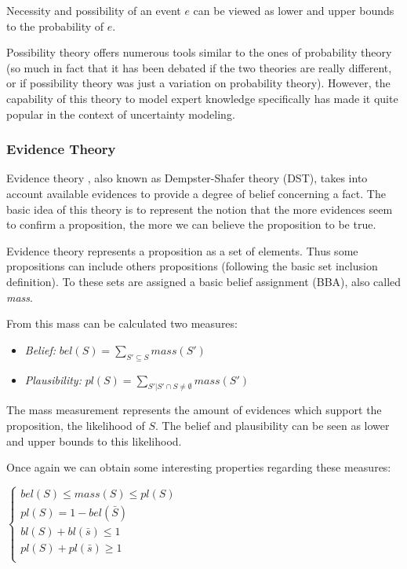 Necessity and possibility of an event $e$ can be viewed as lower and upper bounds to the probability of $e$.

Possibility theory offers numerous tools similar to the ones of probability theory (so much in fact that it has been debated if the two theories are really different, or if possibility theory was just a variation on probability theory). However, the capability of this theory to model expert knowledge specifically has made it quite popular in the context of uncertainty modeling.

\subsubsection{Evidence Theory}

Evidence theory \cite{shafer1976mathematical}, also known as Dempster-Shafer theory (DST), takes into account available evidences to provide a degree of belief concerning a fact.
The basic idea of this theory is to represent the notion that the more evidences seem to confirm a proposition, the more we can believe the proposition to be true.

Evidence theory represents a proposition as a set of elements. Thus some propositions can include others propositions (following the basic set inclusion definition). To these sets are assigned a basic belief assignment (BBA), also called \emph{mass}.

From this mass can be calculated two measures:

\begin{itemize}
\item \emph{Belief:} $bel(S) = \displaystyle\sum_{S'\subseteq{S}} mass(S')$
\item \emph{Plausibility:} $pl(S) = \displaystyle\sum_{S'|S' \cap S \neq \emptyset} mass(S')$
\end{itemize}

The mass measurement represents the amount of evidences which support the proposition, the likelihood of $S$. The belief and plausibility can be seen as lower and upper bounds to this likelihood.

Once again we can obtain some interesting properties regarding these measures:

$\left\{
\begin{array}{l}
bel(S) \leq mass(S) \leq pl(S)\\
pl(S) = 1 - bel(\bar{S})\\
bl(S) + bl(\bar{s}) \leq 1\\
pl(S) + pl(\bar{s}) \geq 1\\
\end{array}
\right.$
\\

